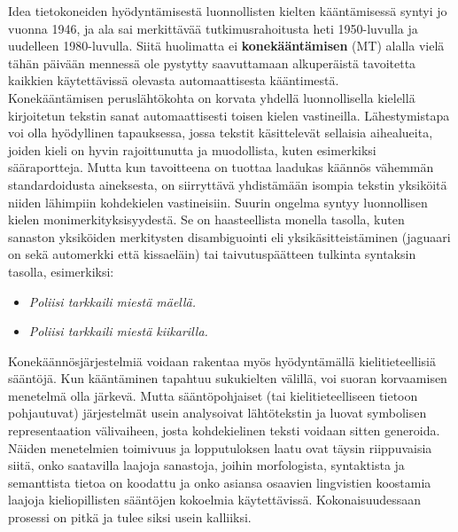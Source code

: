 \begin{multicols}{2}
Idea tietokoneiden hyödyntämisestä luonnollisten kielten
kääntämisessä syntyi jo vuonna 1946, ja ala sai merkittävää 
tutkimusrahoitusta heti 1950-luvulla ja uudelleen 1980-luvulla. Siitä
huolimatta ei \textbf{konekääntämisen} (MT) alalla vielä tähän päivään mennessä
ole pystytty saavuttamaan alkuperäistä tavoitetta kaikkien
käytettävissä olevasta automaattisesta kääntimestä.\\
Konekääntämisen peruslähtökohta on korvata yhdellä luonnollisella
kielellä kirjoitetun tekstin sanat automaattisesti toisen kielen
vastineilla.  Lähestymistapa voi olla hyödyllinen
tapauksessa, jossa tekstit käsittelevät sellaisia aihealueita, joiden
kieli on hyvin rajoittunutta ja muodollista, kuten esimerkiksi
sääraportteja. Mutta kun tavoitteena on tuottaa laadukas käännös
vähemmän standardoidusta aineksesta, on siirryttävä yhdistämään
isompia tekstin yksiköitä niiden lähimpiin kohdekielen
vastineisiin. Suurin ongelma syntyy luonnollisen kielen
monimerkityksisyydestä. Se on haasteellista monella tasolla, kuten
sanaston yksiköiden merkitysten disambiguointi eli
yksikäsitteistäminen (jaguaari on sekä automerkki että kissaeläin) tai
taivutuspäätteen tulkinta syntaksin tasolla, esimerkiksi:

\begin{itemize}
\item[] \textit{Poliisi tarkkaili miestä mäellä.}

\item[] \textit{Poliisi tarkkaili miestä kiikarilla.}
\end{itemize}

Konekäännösjärjestelmiä voidaan rakentaa myös hyödyntämällä
kielitieteellisiä sääntöjä. Kun kääntäminen tapahtuu sukukielten
välillä, voi suoran korvaamisen menetelmä olla järkevä. Mutta sääntöpohjaiset (tai
kielitieteelliseen tietoon pohjautuvat) järjestelmät usein analysoivat
lähtötekstin ja luovat symbolisen representaation välivaiheen, josta
kohdekielinen teksti voidaan sitten generoida. Näiden menetelmien
toimivuus ja lopputuloksen laatu ovat täysin riippuvaisia siitä, onko saatavilla laajoja
sanastoja, joihin morfologista, syntaktista ja semanttista tietoa on
koodattu ja onko asiansa osaavien lingvistien koostamia laajoja
kieliopillisten sääntöjen kokoelmia käytettävissä. Kokonaisuudessaan prosessi on
pitkä ja tulee siksi usein kalliiksi.


\end{multicols}

